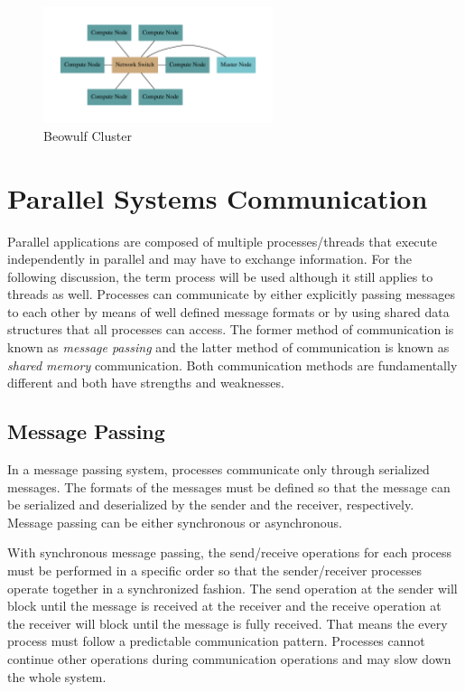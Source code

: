 \documentclass[11pt]{book}
\begin{document}
\begin{figure}
  \centering
  \includegraphics[width=0.6\textwidth,quiet]{figs/graphviz/beowulf.pdf}
  \caption{Beowulf Cluster}\label{beowulf}
\end{figure}

\section{Parallel Systems Communication}

Parallel applications are composed of multiple processes/threads that execute independently in
parallel and may have to exchange information.  For the following discussion, the term process will
be used although it still applies to threads as well.  Processes can communicate by either
explicitly passing messages to each other by means of well defined message formats or by using
shared data structures that all processes can access.  The former method of communication is known
as \emph{message passing} and the latter method of communication is known as \emph{shared memory}
communication.  Both communication methods are fundamentally different and both have strengths and
weaknesses.

\subsection{Message Passing}

In a message passing system, processes communicate only through serialized messages.  The formats of
the messages must be defined so that the message can be serialized and deserialized by the sender
and the receiver, respectively.  Message passing can be either synchronous or asynchronous.

With synchronous message passing, the send/receive operations for each process must be performed in
a specific order so that the sender/receiver processes operate together in a synchronized fashion.
The send operation at the sender will block until the message is received at the receiver and the
receive operation at the receiver will block until the message is fully received.  That means the
every process must follow a predictable communication pattern.  Processes cannot continue other
operations during communication operations and may slow down the whole system.
\end{document}

